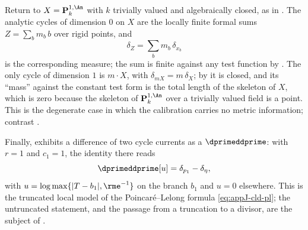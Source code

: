 \begin{example}
\label{ex:ch14-line-cycles}
Return to $X=\mathbf P^{1,\An}_k$ with $k$ trivially valued and
algebraically closed, as in .  The analytic
cycles of dimension $0$ on $X$ are the locally finite formal sums
$Z=\sum_bm_b\,b$ over rigid points, and
\[
 \delta_Z=\sum_bm_b\,\delta_{x_b}
\]
is the corresponding measure; the sum is finite against any test function by
.  The only cycle of dimension $1$ is
$m\cdot X$, with $\delta_{mX}=m\,\delta_X$; by
 it is closed, and its ``mass'' against the
constant test form is the total length of the skeleton of $X$, which is zero
because the skeleton of $\mathbf P^{1,\An}_k$ over a trivially valued field is
a point.  This is the degenerate case in which the calibration carries no
metric information; contrast .

Finally,  exhibits a difference of two cycle
currents as a $\dprimeddprime$: with $r=1$ and $c_1=1$, the identity there
reads
\[
 \dprimeddprime[u]=\delta_{p_1}-\delta_\eta,
\]
with $u=\log\max\{|T-b_1|,\rme^{-1}\}$ on the branch $b_1$ and $u=0$
elsewhere.  This is the truncated local model of the Poincar\'e--Lelong
formula \eqref{eq:appJ-cld-pl}; the untruncated statement, and the passage
from a truncation to a divisor, are the subject of
.
\end{example}

